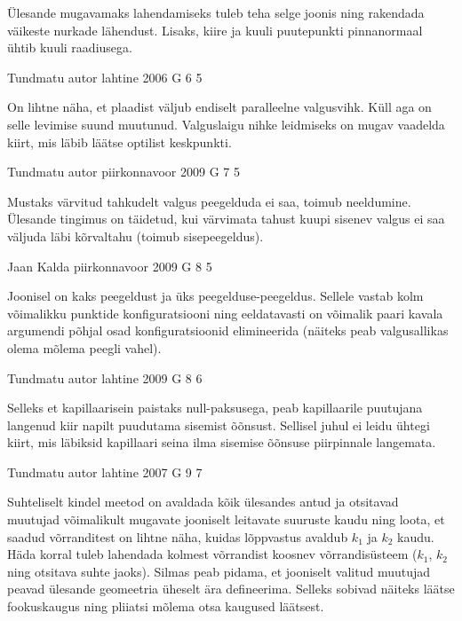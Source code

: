 \documentclass[11pt]{article}
\begin{document}
{{\ifHint
Ülesande mugavamaks lahendamiseks tuleb teha selge joonis ning rakendada väikeste nurkade lähendust. Lisaks, kiire ja kuuli puutepunkti pinnanormaal ühtib kuuli raadiusega.
\fi
}

{Tundmatu autor} %
{lahtine} %
{2006} %
{G 6} %
{5} %
{

\ifHint
On lihtne näha, et plaadist väljub endiselt paralleelne valgusvihk. Küll aga on selle levimise suund muutunud. Valguslaigu nihke leidmiseks on mugav vaadelda kiirt, mis läbib läätse optilist keskpunkti.
\fi
}

{Tundmatu autor} %
{piirkonnavoor} %
{2009} %
{G 7} %
{5} %
{

\ifHint
Mustaks värvitud tahkudelt valgus peegelduda ei saa, toimub neeldumine. Ülesande tingimus on täidetud, kui värvimata tahust kuupi sisenev valgus ei saa
väljuda läbi kõrvaltahu (toimub sisepeegeldus).
\fi
}

{Jaan Kalda} %
{piirkonnavoor} %
{2009} %
{G 8} %
{5} %
{

\ifHint
Joonisel on kaks peegeldust ja üks peegelduse-peegeldus. Sellele vastab kolm võimalikku punktide konfiguratsiooni ning eeldatavasti on võimalik paari kavala argumendi põhjal osad konfiguratsioonid elimineerida (näiteks peab valgusallikas olema mõlema peegli vahel).
\fi
}

{Tundmatu autor} %
{lahtine} %
{2009} %
{G 8} %
{6} %
{

\ifHint
Selleks et kapillaarisein paistaks null-paksusega, peab kapillaarile puutujana langenud kiir napilt puudutama sisemist õõnsust. Sellisel juhul ei leidu ühtegi kiirt, mis läbiksid kapillaari seina ilma sisemise õõnsuse piirpinnale langemata.
\fi
}

{Tundmatu autor} %
{lahtine} %
{2007} %
{G 9} %
{7} %
{

\ifHint
Suhteliselt kindel meetod on avaldada kõik ülesandes antud ja otsitavad muutujad võimalikult mugavate jooniselt leitavate suuruste kaudu ning loota, et saadud võrranditest on lihtne näha, kuidas lõppvastus avaldub $k_1$ ja $k_2$ kaudu. Häda korral tuleb lahendada kolmest võrrandist koosnev võrrandisüsteem ($k_1$, $k_2$ ning otsitava suhte jaoks). Silmas peab pidama, et jooniselt valitud muutujad peavad ülesande geomeetria üheselt ära defineerima. Selleks sobivad näiteks läätse fookuskaugus ning pliiatsi mõlema otsa kaugused läätsest.
\fi
}

}
\end{document}
